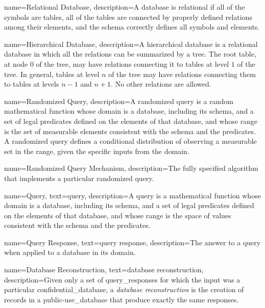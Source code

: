 {
    name=Relational Database,
    description={A database is relational if all of the symbols are tables, all of the tables are connected by properly defined relations among their elements, and the schema correctly defines all symbols and elements.}
}

{
    name=Hierarchical Database,
    description={A hierarchical database is a relational database in which all the relations can be summarized by a tree. The root table, at node $0$ of the tree, may have relations connecting it to tables at level $1$ of the tree. In general, tables at level $n$ of the tree may have relations connecting them to tables at levels $n-1$ and $n+1$. No other relations are allowed.}
}

{
    name=Randomized Query,
    description={A randomized query is a random mathematical function whose domain is a database, including its schema, and a set of legal predicates defined on the elements of that database, and whose range is the set of measurable elements consistent with the schema and the predicates. A randomized query defines a conditional distribution of observing a measurable set in the range, given the specific inputs from the domain.}
}

{
    name=Randomized Query Mechanism,
    description={The fully specified algorithm that implements a particular randomized query.}
}

{
    name=Query,
    text=query,
    description={A query is a mathematical function whose domain is a database, including its schema, and a set of legal predicates defined on the elements of that database, and whose range is the space of values consistent with the schema and the predicates.}
}

{
    name=Query Response,
    text=query response,
    description={The answer to a \gls{query} when applied to a \gls{database} in its domain.}
}

{
    name=Database Reconstruction,
    text=database reconstruction,
    description={Given only a set of \glspl{query_response} for which the input was a particular \gls{confidential_database}, a \textit{database reconstruction} is the creation of \glspl{record} in a \gls{public-use_database} that produce exactly the same responses.}
}

